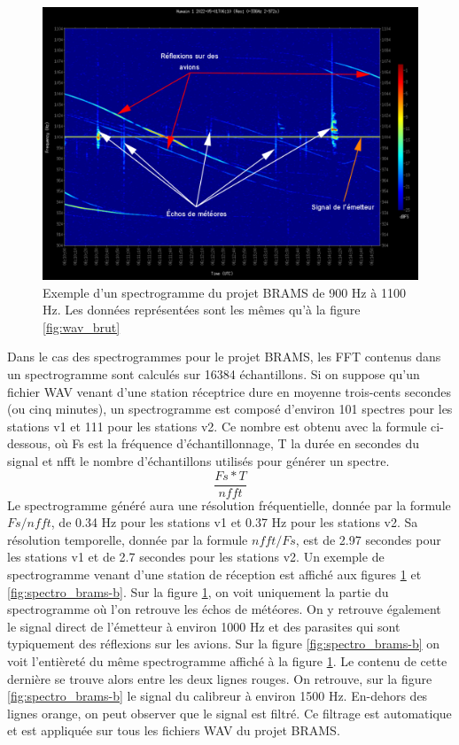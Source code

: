 \documentclass[11pt]{article}
\begin{document}
\begin{figure}[h]
    \begin{center}
        \includegraphics[scale=0.29]{spectrogramme_legend.png}
        \caption{Exemple d'un spectrogramme du projet BRAMS de 900 Hz à 1100 Hz. Les données représentées sont les mêmes qu'à la figure \ref{fig:wav_brut}}
        \label{fig:spectro_brams-a}
    \end{center}
\end{figure}

Dans le cas des spectrogrammes pour le projet BRAMS, les FFT contenus dans un spectrogramme sont calculés sur 16384 échantillons.
Si on suppose qu'un fichier WAV venant d'une station réceptrice dure en moyenne trois-cents secondes (ou cinq minutes), un spectrogramme est composé d'environ 101 spectres pour les stations v1 et 111 pour les stations v2.
Ce nombre est obtenu avec la formule ci-dessous, où Fs est la fréquence d'échantillonnage, T la durée en secondes du signal et nfft le nombre d'échantillons utilisés pour générer un spectre.
\[\frac{Fs * T}{nfft}\]
Le spectrogramme généré aura une résolution fréquentielle, donnée par la formule \(Fs / nfft\), de 0.34 Hz pour les stations v1 et 0.37 Hz pour les stations v2.
Sa résolution temporelle, donnée par la formule \(nfft / Fs\), est de 2.97 secondes pour les stations v1 et de 2.7 secondes pour les stations v2.
Un exemple de spectrogramme venant d'une station de réception est affiché aux figures \ref{fig:spectro_brams-a} et \ref{fig:spectro_brams-b}.
Sur la figure \ref{fig:spectro_brams-a}, on voit uniquement la partie du spectrogramme où l'on retrouve les échos de météores.
On y retrouve également le signal direct de l'émetteur à environ 1000 Hz et des parasites qui sont typiquement des réflexions sur les avions.
Sur la figure \ref{fig:spectro_brams-b} on voit l'entièreté du même spectrogramme affiché à la figure \ref{fig:spectro_brams-a}.
Le contenu de cette dernière se trouve alors entre les deux lignes rouges.
On retrouve, sur la figure \ref{fig:spectro_brams-b} le signal du calibreur à environ 1500 Hz.
En-dehors des lignes orange, on peut observer que le signal est filtré.
Ce filtrage est automatique et est appliquée sur tous les fichiers WAV du projet BRAMS.
\end{document}
